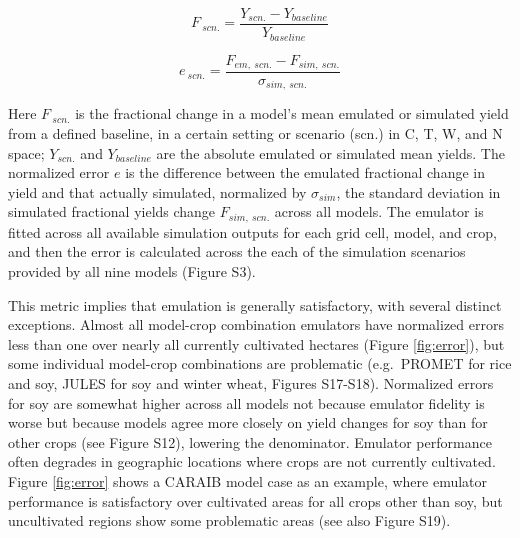 \documentclass[esd, manuscript]{copernicus} %
\begin{document}
\begin{equation}
    \label{eqn:per_yield}
    F_{\: scn.}=\frac{Y_{scn.}-Y_{baseline}}{Y_{baseline}}
\end{equation}

\begin{equation}
    \label{eqn:error}
    e_{\: scn.} =\frac{F_{em, \: scn.}-F_{sim, \: scn.}}{\sigma_{sim, \: scn.}}
\end{equation}

Here $F_{\: scn.}$ is the fractional change in a model's mean emulated or simulated yield from a defined baseline, in a certain setting or scenario (scn.) in C, T, W, and N space; $Y_{scn.}$ and $Y_{baseline}$ are the absolute emulated or simulated mean yields. The normalized error $e$ is the difference between the emulated fractional change in yield and that actually simulated, normalized by $\sigma_{sim}$, the standard deviation in simulated fractional yields change $F_{sim,\: scn.}$ across all models. The emulator is fitted across all available simulation outputs for each grid cell, model, and crop, and then the error is calculated across the each of the simulation scenarios provided by all nine models (Figure S3). 

This metric implies that emulation is generally satisfactory, with several distinct exceptions. Almost all model-crop combination emulators have normalized errors less than one over nearly all currently cultivated hectares (Figure \ref{fig:error}), but some individual model-crop combinations are problematic (e.g.\ PROMET for rice and soy, JULES for soy and winter wheat, Figures S17-S18). Normalized errors for soy are somewhat higher across all models not because emulator fidelity is worse but because models agree more closely on yield changes for soy than for other crops (see Figure S12), lowering the denominator. Emulator performance often degrades in geographic locations where crops are not currently cultivated. Figure \ref{fig:error} shows a CARAIB model case as an example, where emulator performance is satisfactory over cultivated areas for all crops other than soy, but uncultivated regions show some problematic areas (see also Figure S19).
\end{document}

